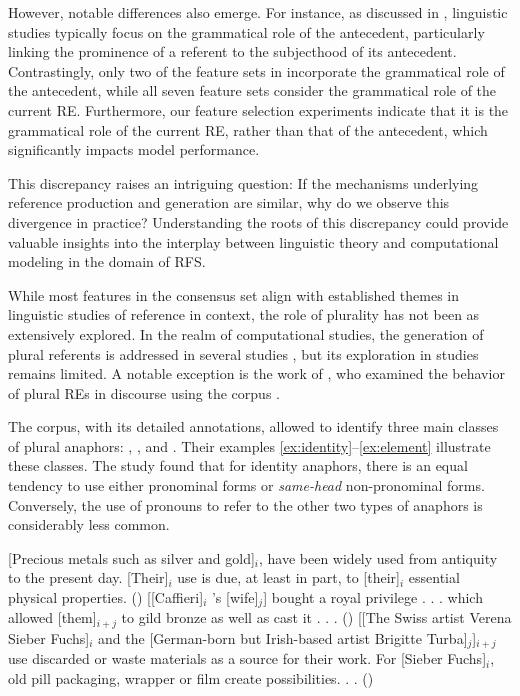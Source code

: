However, notable differences also emerge. For instance, as discussed in , linguistic studies typically focus on the grammatical role of the antecedent, particularly linking the prominence of a referent to the subjecthood of its antecedent. Contrastingly, only two of the feature sets in  incorporate the grammatical role of the antecedent, while all seven feature sets consider the grammatical role of the current RE. Furthermore, our feature selection experiments indicate that it is the grammatical role of the current RE, rather than that of the antecedent, which significantly impacts model performance.

This discrepancy raises an intriguing question: If the mechanisms underlying reference production and generation are similar, why do we observe this divergence in practice? Understanding the roots of this discrepancy could provide valuable insights into the interplay between linguistic theory and computational modeling in the domain of RFS.
 
While most features in the consensus set align with established themes in linguistic studies of reference in context, the role of plurality has not been as extensively explored. In the realm of computational studies, the generation of plural referents is addressed in several \shot studies \citep{deemter2002generating,gatt-van-deemter-2007-incremental}, but its exploration in \context studies remains limited. A notable exception is the work of \citet{gatt2009generating}, who examined the behavior of plural REs in discourse using the  corpus \citep{poesio2000gnome}.

The  corpus, with its detailed annotations, allowed \citet{gatt2009generating} to identify three main classes of plural anaphors: , , and . Their examples \ref{ex:identity}--\ref{ex:element} illustrate these classes. The study found that for identity anaphors, there is an equal tendency to use either pronominal forms or \textit{same-head} non-pronominal forms. Conversely, the use of pronouns to refer to the other two types of anaphors is considerably less common.

\begin{exe}
	\ex
	\begin{xlist}
		\ex\label{ex:identity}  [Precious metals such as silver and gold]$_{i}$, have been widely used
		from antiquity to the present day. [Their]$_{i}$ use is due, at least in part, to [their]$_{i}$ essential physical properties. ()
		\ex\label{ex:split}  [[Caffieri]$_{i}$ ’s [wife]$_{j}$]
		bought a royal privilege . . . which allowed [them]$_{i+j}$ to gild bronze as well as cast it . . .
		()
		\ex\label{ex:element}  [[The Swiss artist Verena Sieber Fuchs]$_{i}$ and the
		[German-born but Irish-based artist Brigitte Turba]$_{j}$]$_{i+j}$ use
		discarded or waste materials as a source for their work. For [Sieber Fuchs]$_{i}$, old pill packaging, wrapper or film create possibilities. . .
		()
	\end{xlist}
\end{exe} 



